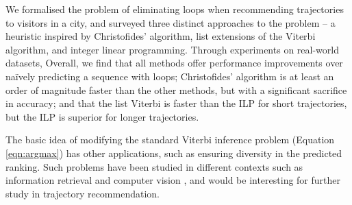 
We formalised the problem of eliminating loops when recommending trajectories to visitors in a city,
and surveyed three distinct approaches to the problem -- a heuristic inspired by Christofides' algorithm, list extensions of the Viterbi algorithm, and integer linear programming.
Through experiments on real-world datasets, 
Overall, we find that
all methods offer performance improvements over na\"{i}vely predicting a sequence with loops;
Christofides' algorithm is at least an order of magnitude faster than the other methods, but with a significant sacrifice in accuracy;
and that the list Viterbi is faster than the ILP for short trajectories, but the ILP is superior for longer trajectories.

The basic idea of modifying the standard Viterbi inference problem (Equation \ref{eqn:argmax}) has other applications, such
as ensuring diversity in the predicted ranking.
Such problems have been studied in different contexts such as information retrieval \citep{Carbonell:1998} and computer vision \citep{Park:2011},
and would be interesting for further study in trajectory recommendation.

